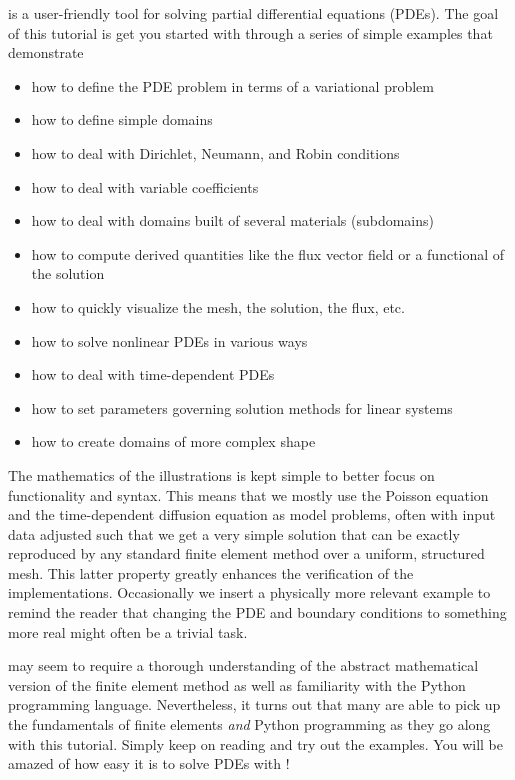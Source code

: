 \fenics{} is a user-friendly tool for solving partial differential
equations (PDEs). The goal of this tutorial is get you started with
\fenics{} through a series of
simple examples that demonstrate
\begin{itemize}
\item
how to define the PDE problem in terms of a variational problem
\item
how to define simple domains
\item
how to deal with Dirichlet, Neumann, and Robin conditions
\item
how to deal with variable coefficients
\item
how to deal with domains built of several materials (subdomains)
\item
how to compute derived quantities like the flux vector field or
a functional of the solution
\item
how to quickly visualize the mesh, the solution, the flux, etc.
\item
how to solve nonlinear PDEs in various ways
\item
how to deal with time-dependent PDEs
\item
how to set parameters governing solution methods for linear systems
\item
how to create domains of more complex shape
\end{itemize}
The mathematics of the illustrations is kept simple to better focus
on \fenics{} functionality and syntax. This means that we mostly use
the Poisson equation and the time-dependent diffusion equation
as model problems, often with input data adjusted such that we get
a very simple solution that can be exactly reproduced by any standard
finite element method over a uniform, structured mesh. This
latter property greatly enhances the verification of the implementations.
Occasionally we insert a physically more relevant example
to remind the reader that changing the PDE and boundary
conditions to something more real might often be a trivial task.


\fenics{} may seem to require a thorough understanding of the abstract
mathematical version of the finite element method as well as
familiarity with the Python programming language.  Nevertheless, it
turns out that many are able to pick up the fundamentals of finite
elements \emph{and} Python programming as they go along with this
tutorial. Simply keep on reading and try out the examples. You will be
amazed of how easy it is to solve PDEs with \fenics!


